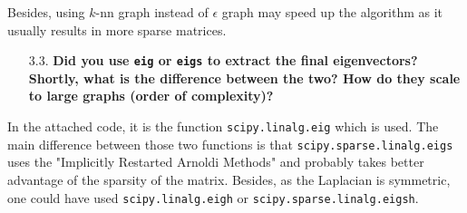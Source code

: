 \documentclass[a4paper, 11pt]{report}
\begin{document}
    Besides, using $k$-nn graph instead of $\epsilon$ graph may speed up the algorithm as it usually results in more sparse matrices.

\begin{itemize}
    \item[3.3.] \textbf{Did you use \texttt{eig} or \texttt{eigs} to extract the final eigenvectors? Shortly, what is the difference between the two? How do they scale to large graphs (order of complexity)?}
\end{itemize}
    
    In the attached code, it is the function \texttt{scipy.linalg.eig} which is used. The main difference between those two functions is that \texttt{scipy.sparse.linalg.eigs} uses the "Implicitly Restarted Arnoldi Methods" and probably takes better advantage of the sparsity of the matrix. Besides, as the Laplacian is symmetric, one could have used \texttt{scipy.linalg.eigh} or \texttt{scipy.sparse.linalg.eigsh}.
\end{document}
